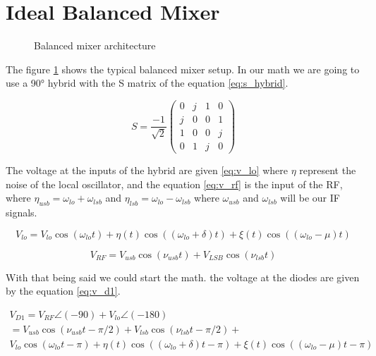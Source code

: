 
\section{Ideal Balanced Mixer}\label{section-introduction}

\begin{figure}[t]
    \centering
    
    \caption{Balanced mixer architecture}
    \label{fig:bm_ideal}
\end{figure}


The figure \ref{fig:bm_ideal} shows the typical balanced mixer setup. In our math we are going to use a 90° hybrid with the S matrix of the equation \ref{eq:s_hybrid}.

\begin{equation}
    \label{eq:s_hybrid}
    S = \frac{-1}{\sqrt{2}}
    \begin{pmatrix}
        0 & j & 1 & 0 \\
        j & 0 & 0 & 1 \\
        1 & 0 & 0 & j \\
        0 & 1 & j & 0 
    \end{pmatrix}
\end{equation}



The voltage at the inputs of the hybrid are given \ref{eq:v_lo} where $\eta$ represent the noise of the local oscillator, and the equation \ref{eq:v_rf} is the input of the RF, where $\eta_{usb}=\omega_{lo}+\omega_{lsb}$ and $\eta_{lsb}=\omega_{lo}-\omega_{lsb}$ where $\omega_{usb}$ and $\omega_{lsb}$ will be our IF signals.

\begin{equation}
    \label{eq:v_lo}
    V_{lo} = V_{lo}\cos(\omega_{lo}t)+\eta(t)\cos((\omega_{lo}+\delta)t)+\xi(t)\cos((\omega_{lo}-\mu)t)
\end{equation}

\begin{equation}
    \label{eq:v_rf}
    V_{RF} = V_{usb}\cos(\nu_{usb}t)+V_{LSB}\cos(\nu_{lsb}t)
\end{equation}


With that being said we could start the math. the voltage at the diodes are given by the equation \ref{eq:v_d1}.

\begin{equation}
    \label{eq:d1}
    \begin{gathered}
    V_{D1}=V_{RF}\angle{(-90)}+V_{lo}\angle{(-180)} \\
    = V_{usb}\cos(\nu_{usb}t-\pi/2)+V_{lsb}\cos(\nu_{lsb}t-\pi/2) +\\  V_{lo}\cos(\omega_{lo}t-\pi)+\eta(t)\cos((\omega_{lo}+\delta)t-\pi) +\xi(t)\cos((\omega_{lo}-\mu)t-\pi)
    \end{gathered}
\end{equation}


